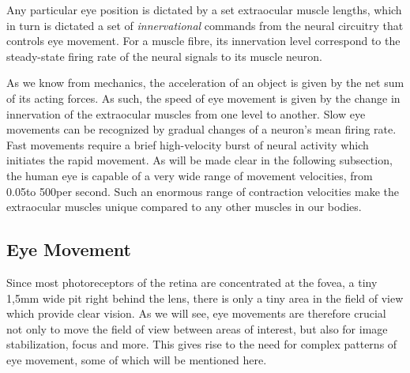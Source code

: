 Any particular eye position is dictated by a set extraocular muscle lengths, which in turn is dictated a set of \textit{innervational} commands from the neural circuitry that controls eye movement. For a muscle fibre, its innervation level correspond to the steady-state firing rate of the neural signals to its muscle neuron. 


As we know from mechanics, the acceleration of an object is given by the net sum of its acting forces. As such, the speed of eye movement is given by the change in innervation of the extraocular muscles from one level to another. Slow eye movements can be recognized by gradual changes of a neuron's mean firing rate. Fast movements require a brief high-velocity burst of neural activity which initiates the rapid movement. 
As will be made clear in the following subsection, the human eye is capable of a very wide range of movement velocities, from 0.05\degree to 500\degree per second. Such an enormous range of contraction velocities make the extraocular muscles unique compared to any other muscles in our bodies.


\subsection{Eye Movement}
Since most photoreceptors of the retina are concentrated at the fovea, a tiny 1,5mm wide pit right behind the lens, there is only a tiny area in the field of view which provide clear vision. As we will see, eye movements are therefore crucial not only to move the field of view between areas of interest, but also for image stabilization, focus and more. This gives rise to the need for complex patterns of eye movement, some of which will be mentioned here.

